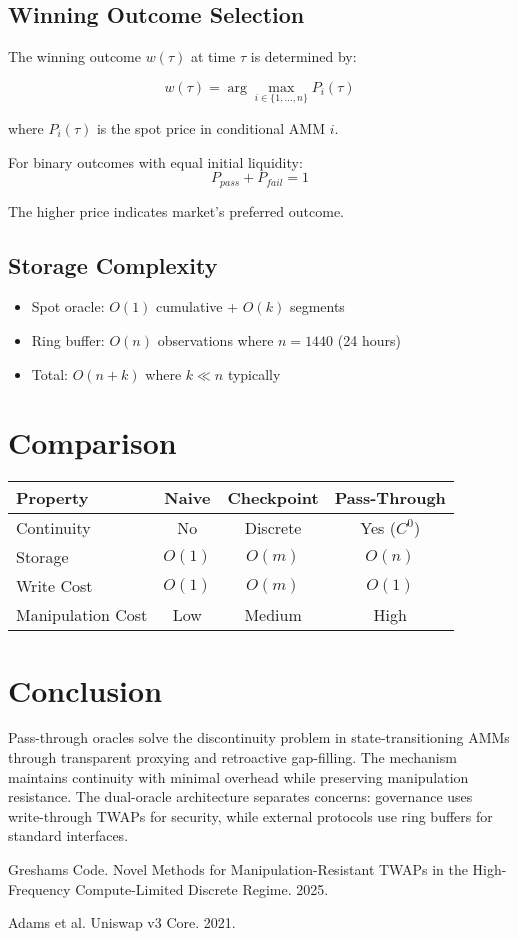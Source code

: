 \documentclass{article}
\begin{document}
\subsection{Winning Outcome Selection}

The winning outcome $w(\tau)$ at time $\tau$ is determined by:

$$w(\tau) = \arg\max_{i \in \{1,...,n\}} P_i(\tau)$$

where $P_i(\tau)$ is the spot price in conditional AMM $i$.

For binary outcomes with equal initial liquidity:
$$P_{pass} + P_{fail} = 1$$

The higher price indicates market's preferred outcome.

\subsection{Storage Complexity}
\begin{itemize}
\item Spot oracle: $O(1)$ cumulative + $O(k)$ segments
\item Ring buffer: $O(n)$ observations where $n = 1440$ (24 hours)
\item Total: $O(n + k)$ where $k \ll n$ typically
\end{itemize}

\section{Comparison}

\begin{center}
\begin{tabular}{|l|c|c|c|}
\hline
\textbf{Property} & \textbf{Naive} & \textbf{Checkpoint} & \textbf{Pass-Through} \\
\hline
Continuity & No & Discrete & Yes ($C^0$) \\
Storage & $O(1)$ & $O(m)$ & $O(n)$ \\
Write Cost & $O(1)$ & $O(m)$ & $O(1)$ \\
Manipulation Cost & Low & Medium & High \\
\hline
\end{tabular}
\end{center}

\section{Conclusion}

Pass-through oracles solve the discontinuity problem in state-transitioning AMMs through transparent proxying and retroactive gap-filling. The mechanism maintains continuity with minimal overhead while preserving manipulation resistance. The dual-oracle architecture separates concerns: governance uses write-through TWAPs for security, while external protocols use ring buffers for standard interfaces.

\begin{thebibliography}{9}
Greshams Code. Novel Methods for Manipulation-Resistant TWAPs in the High-Frequency Compute-Limited Discrete Regime. 2025.

Adams et al. Uniswap v3 Core. 2021.
\end{thebibliography}
\end{document}
